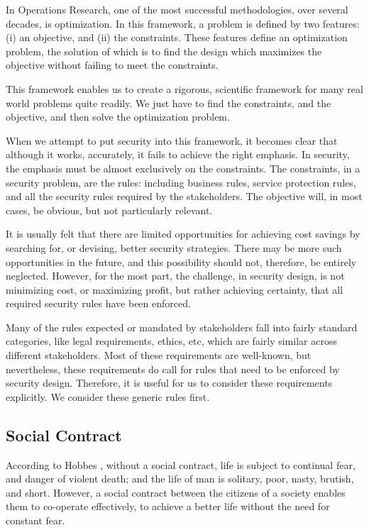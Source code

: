 In Operations Research, one of the most successful methodologies, over several decades, is optimization. In this framework, a problem is defined by two features: (i) an objective, and (ii) the constraints. These features define an optimization problem, the solution of which is to find the design which maximizes the objective without failing to meet the constraints.

This framework enables us to create a rigorous, scientific framework for many real world problems quite readily. We just have to find the constraints, and the objective, and then solve the optimization problem.


When we attempt to put security into this framework, it becomes clear that although it works, accurately, it fails to achieve the right emphasis. In security, the emphasis must be almost exclusively on the constraints. The constraints, in a security problem, are the rules: including business rules, service protection rules, and all the security rules required by the stakeholders. The objective will, in most cases, be obvious, but not particularly relevant.

It is usually felt that there are limited opportunities for achieving cost savings by searching for, or devising, better security strategies. There may be more such opportunities in the future, and this possibility should not, therefore, be entirely neglected. However, for the most part, the challenge, in security design, is not minimizing cost, or maximizing profit, but rather achieving certainty, that all required security rules have been enforced.

Many of the rules expected or mandated by stakeholders fall into fairly standard categories, like legal requirements, ethics, etc, which are fairly similar across different stakeholders. Most of these 
 requirements are well-known, but nevertheless, these requirements do call for rules that need to be enforced by security design. Therefore, it is useful for us to consider these requirements explicitly. We consider these generic rules first.

 
\subsection{Social Contract}
According to Hobbes \cite{Leviathan}, without a social contract, life is subject to continual fear, and danger of violent death; and the life of man is solitary, poor, nasty, brutish, and short. 
However, a social contract between the citizens of a society enables them to co-operate effectively, to achieve a better life without the need for constant fear.

